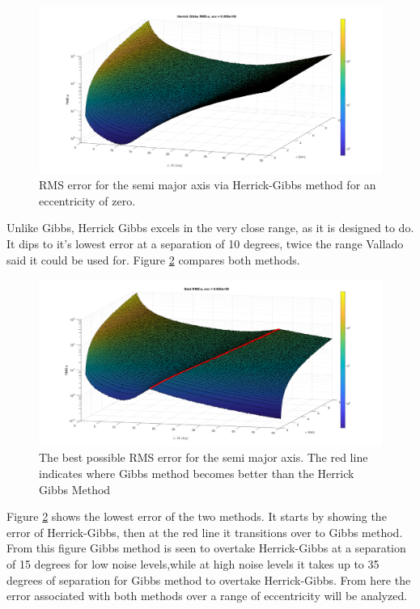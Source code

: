 \documentclass[12pt]{article}
\begin{document}
	\begin{figure}[H]
		\centering
		\includegraphics[width=0.7\linewidth]{circularHerrickGibbs}
		\caption{RMS error for the semi major axis via Herrick-Gibbs method for an eccentricity of zero.}
		\label{fig:circularherrickgibbs}
	\end{figure}
	

	Unlike Gibbs, Herrick Gibbs excels in the very close range, as it is designed to do. It dips to it's lowest error at a separation of 10 degrees, twice the range Vallado  \cite{vallado2007fundamentals} said it could be used for. Figure \ref{fig:bestmethodscirc} compares both methods.

\begin{figure}
	\centering
	\includegraphics[width=0.7\linewidth]{bestMethodsCirc}
	\caption{The best possible RMS error for the semi major axis. The red line indicates where Gibbs method becomes better than the Herrick Gibbs Method}
	\label{fig:bestmethodscirc}
\end{figure}
	Figure \ref{fig:bestmethodscirc} shows the lowest error of the two methods. It starts by showing the error of Herrick-Gibbs, then at the red line it transitions over to Gibbs method. From this figure Gibbs method is seen to overtake Herrick-Gibbs at a separation of 15 degrees for low noise levels,while at high noise levels it takes up to 35 degrees of separation for Gibbs method to overtake Herrick-Gibbs. From here the error associated with both methods over a range of eccentricity will be analyzed.\par 
	
\end{document}
